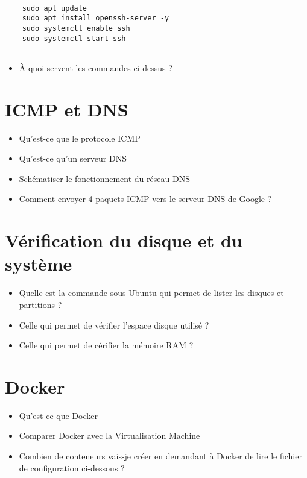 \documentclass[12pt, letterpaper]{article}
\begin{document}
\begin{verbatim}

    sudo apt update
    sudo apt install openssh-server -y
    sudo systemctl enable ssh
    sudo systemctl start ssh
    
\end{verbatim}
\begin{itemize}
    \item À quoi servent les commandes ci-dessus ? 
\end{itemize}


\section{ICMP et DNS}

\begin{itemize}
    \item Qu'est-ce que le protocole ICMP 
    \item Qu'est-ce qu'un serveur DNS 
    \item Schématiser le fonctionnement du réseau DNS
    \item Comment envoyer 4 paquets ICMP vers le serveur DNS de Google ?
\end{itemize}


\section{Vérification du disque et du système}

\begin{itemize}
    \item Quelle est la commande sous Ubuntu qui permet de  lister les disques et partitions ?
    \item Celle qui permet de vérifier l’espace disque utilisé ?
    \item Celle qui permet de cérifier la mémoire RAM ?
\end{itemize}



\section{Docker}


\begin{itemize}
    \item Qu'est-ce que Docker 
    \item Comparer Docker avec la Virtualisation Machine
    \item Combien de conteneurs vais-je créer en demandant à Docker de lire le fichier de configuration ci-dessous ?
\end{itemize}
\end{document}
